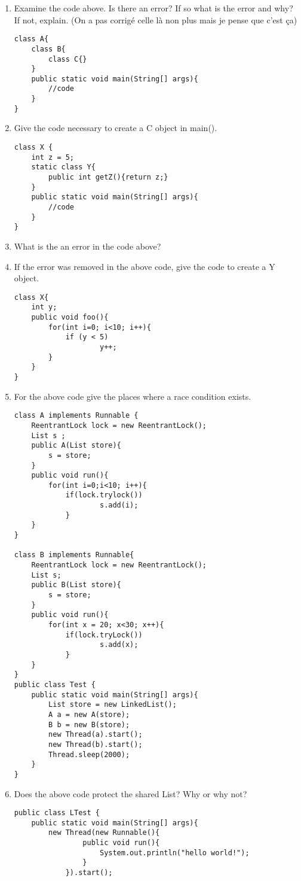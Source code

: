 \documentclass{article}
\begin{document}
\begin{enumerate}
\begin{lstlisting}
  		}
 	}
}
\end{lstlisting}
	\item Examine the code above. Is there an error? If so what is the error and why? If not, explain. (On a pas corrigé celle là non plus mais je pense que c'est ça)\newline
\begin{lstlisting}
class A{
 	class B{
  		class C{}
 	}
	public static void main(String[] args){
 		//code
	}
}
\end{lstlisting}
	\item Give the code necessary to create a C object in main().
	\newpage
\begin{lstlisting}
class X {
 	int z = 5;
 	static class Y{
  		public int getZ(){return z;}
 	}
 	public static void main(String[] args){
 		//code
 	}
}
\end{lstlisting}
	\item What is the an error in the code above?
	\item If the error was removed in the above code, give the  code to create a Y object.
	\newpage
\begin{lstlisting}
class X{
 	int y;
 	public void foo(){
  		for(int i=0; i<10; i++){
   			if (y < 5)
    				y++;
 		}
 	}
}
\end{lstlisting}
	\item For the above code give the places where a race condition exists.
\begin{lstlisting}
class A implements Runnable {
 	ReentrantLock lock = new ReentrantLock();
 	List s ;
 	public A(List store){
 		s = store;
 	}
 	public void run(){
 		for(int i=0;i<10; i++){
   			if(lock.trylock())
    				s.add(i);
    		}
 	}
}

class B implements Runnable{
 	ReentrantLock lock = new ReentrantLock();
 	List s;
 	public B(List store){
 		s = store;
 	}
 	public void run(){
  		for(int x = 20; x<30; x++){
   			if(lock.tryLock())
    				s.add(x);
    		}
 	}
}
public class Test {
 	public static void main(String[] args){
  		List store = new LinkedList();
  		A a = new A(store);
  		B b = new B(store);
  		new Thread(a).start();
  		new Thread(b).start();
  		Thread.sleep(2000);
 	}
}
\end{lstlisting}
	\item Does the above code protect the shared List? Why or why not?
	\newpage
\begin{lstlisting}
public class LTest {
 	public static void main(String[] args){
  		new Thread(new Runnable(){
     			public void run(){
      				System.out.println("hello world!");
     			}
     		}).start();
 

\end{lstlisting}
\end{enumerate}
\end{document}
